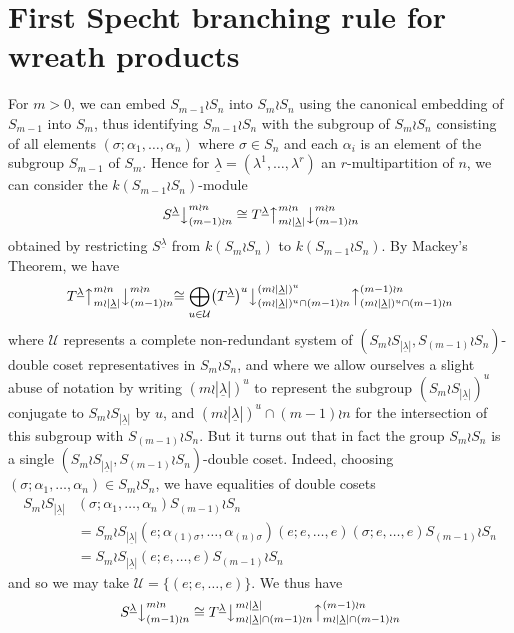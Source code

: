 \documentclass[10pt]{article}
\theoremstyle{definition}
\newcommand{\ul}[1]{\underline{#1}}
\begin{document}
\section{First Specht branching rule for wreath products}
For $m>0$, we can embed $S_{m-1} \wr S_n$ into $S_m \wr S_n$ using the canonical embedding of $S_{m-1}$ into $S_m$, thus identifying
$S_{m-1} \wr S_n$ with the subgroup of $S_m \wr S_n$ consisting of all elements $(\sigma;\alpha_1,\ldots,\alpha_n)$ where $\sigma \in S_n$
and each $\alpha_i$ is an element of the subgroup $S_{m-1}$ of $S_m$. Hence for $\ul{\lambda} = (\lambda^1,\ldots,\lambda^r)$ an
$r$-multipartition of $n$, we can consider the $k(S_{m-1} \wr S_n)$-module
\[ \left.S^{\ul{\lambda}}\right\downarrow^{m \wr n}_{(m-1) \wr n} \cong
T^{\ul{\lambda}}\bigl\uparrow^{m{\wr}n}_{m{\wr}|\ul{\lambda}|}\bigl\downarrow^{m \wr n}_{(m-1) \wr n}\]
obtained by restricting $S^{\ul{\lambda}}$ from $k(S_m \wr S_n)$ to $k(S_{m-1} \wr S_n)$. By  Mackey's Theorem, we have
\[
T^{\ul{\lambda}}\bigl\uparrow^{m{\wr}n}_{m{\wr}|\ul{\lambda}|}\bigl\downarrow^{m \wr n}_{(m-1) \wr n}\cong
\bigoplus_{u \in \mathcal{U}}\bigl(T^{\ul{\lambda}}\bigr)^u\bigl\downarrow^{(m{\wr}|\ul{\lambda}|)^u}_{(m{\wr}|\ul{\lambda}|)^u \cap (m-1) \wr n}
\bigl\uparrow^{(m-1) \wr n}_{(m{\wr}|\ul{\lambda}|)^u\cap (m-1) \wr n}
\]
where $\mathcal{U}$ represents a complete
non-redundant system of $(S_m \wr S_{|\ul{\lambda}|},S_{(m-1)} \wr S_n)$-double coset representatives in $S_m \wr S_n$, and where we allow
ourselves a slight abuse of notation by writing $(m \wr |\ul{\lambda}|)^u$ to represent the subgroup $(S_m \wr S_{|\ul{\lambda}|})^u$
conjugate to $S_m \wr S_{|\ul{\lambda}|}$ by $u$, and  $(m \wr |\ul{\lambda}|)^u \cap(m-1) \wr n$ for the intersection of this subgroup
with $S_{(m-1)} \wr S_n$. But it turns out that in fact the group $S_m \wr S_n$ is a single
$(S_m \wr S_{|\ul{\lambda}|},S_{(m-1)} \wr S_n)$-double coset. Indeed, choosing $(\sigma;\alpha_1,\ldots,\alpha_n)
\in S_m \wr S_n$, we have equalities of double cosets
\begin{align*}
S_m{\wr}S_{|\ul{\lambda}|}&(\sigma;\alpha_1,\ldots,\alpha_n)S_{(m-1)}{\wr}S_n\\
& = S_m{\wr}S_{|\ul{\lambda}|}(e;\alpha_{(1)\sigma},\ldots,\alpha_{(n)\sigma})(e;e,\ldots,e)(\sigma;e,\ldots,e)S_{(m-1)}{\wr}S_n\\
& = S_m{\wr}S_{|\ul{\lambda}|}(e;e,\ldots,e)S_{(m-1)}{\wr}S_n
\end{align*}
and so we may take $\mathcal{U} = \{(e;e,\ldots,e)\}$. We thus have
\[
\left.S^{\ul{\lambda}}\right\downarrow^{m \wr n}_{(m-1) \wr n} \cong
T^{\ul{\lambda}}\bigl\downarrow^{m{\wr}|\ul{\lambda}|}_{m{\wr}|\ul{\lambda}| \cap(m-1) \wr n}
\bigl\uparrow^{(m-1) \wr n}_{m{\wr}|\ul{\lambda}| \cap(m-1) \wr n}
\]
\end{document}
